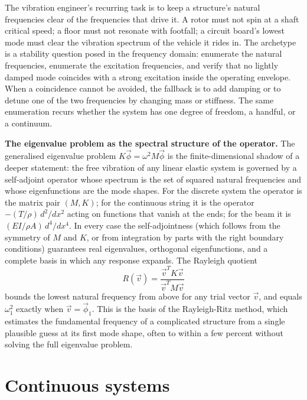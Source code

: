 \begin{archetype}
The vibration engineer's recurring task is to keep a structure's
natural frequencies clear of the frequencies that drive it. A rotor
must not spin at a shaft critical speed; a floor must not resonate
with footfall; a circuit board's lowest mode must clear the vibration
spectrum of the vehicle it rides in. The archetype is a stability
question posed in the frequency domain: enumerate the natural
frequencies, enumerate the excitation frequencies, and verify that no
lightly damped mode coincides with a strong excitation inside the
operating envelope. When a coincidence cannot be avoided, the fallback
is to add damping or to detune one of the two frequencies by changing
mass or stiffness. The same enumeration recurs whether the system has
one degree of freedom, a handful, or a continuum.
\end{archetype}

\begin{mastery}
\textbf{The eigenvalue problem as the spectral structure of the
operator.} The generalised eigenvalue problem $K\vec{\phi} = \omega^2
M\vec{\phi}$ is the finite-dimensional shadow of a deeper statement:
the free vibration of any linear elastic system is governed by a
self-adjoint operator whose spectrum is the set of squared natural
frequencies and whose eigenfunctions are the mode shapes. For the
discrete system the operator is the matrix pair $(M, K)$; for the
continuous string it is the operator $-(T/\rho)\,d^2/dx^2$ acting on
functions that vanish at the ends; for the beam it is
$(EI/\rho A)\,d^4/dx^4$. In every case the self-adjointness (which
follows from the symmetry of $M$ and $K$, or from integration by
parts with the right boundary conditions) guarantees real
eigenvalues, orthogonal eigenfunctions, and a complete basis in which
any response expands. The Rayleigh quotient
\[
R(\vec{v}) = \frac{\vec{v}^T K \vec{v}}{\vec{v}^T M \vec{v}}
\]
bounds the lowest natural frequency from above for any trial vector
$\vec{v}$, and equals $\omega_1^2$ exactly when $\vec{v} =
\vec{\phi}_1$. This is the basis of the Rayleigh-Ritz method, which
estimates the fundamental frequency of a complicated structure from a
single plausible guess at its first mode shape, often to within a few
percent without solving the full eigenvalue problem.
\end{mastery}

\section{Continuous systems}

